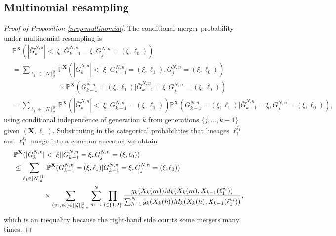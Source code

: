 \documentclass[a4paper,11pt]{article}
\theoremstyle{definition}
\newcommand{\bbP}{\mathbb{P}}
\newcommand{\bfX}{\mathbf{X}}
\begin{document}
\subsection{Multinomial resampling} \label{app:multinomial}

\begin{proof}[Proof of Proposition \ref{prop:multinomial}]

The conditional merger probability under multinomial resampling is
\begin{align*}
&\bbP^{ \bfX }( | \bar{ G }_k^{ N, n } | < | \xi | | \bar{ G }_{ k - 1 }^{ N, n } = \xi, G_j^{ N, n } = ( \xi, \ell_0 ) ) \\
&= \sum_{ \ell_1 \in [ N ]_d^{ | \xi | } } \bbP^{ \bfX }( | \bar{ G }_k^{ N, n } | < | \xi | | G_{ k - 1 }^{ N, n } = ( \xi, \ell_1 ), G_j^{ N, n } = ( \xi, \ell_0 ) ) \\
&\phantom{= \sum_{ \ell_1 \in [ N ]_d^{ | \xi | } } } \times \bbP^{ \bfX }( G_{ k - 1 }^{ N, n } = ( \xi, \ell_1 ) | \bar{ G }_{ k - 1 }^{ N, n } = \xi, G_j^{ N, n } = ( \xi, \ell_0 ) ) \\
&= \sum_{ \ell_1 \in [ N ]_d^{ | \xi | } } \bbP^{ \bfX }( | \bar{ G }_k^{ N, n } | < | \xi | | G_{ k - 1 }^{ N, n } = ( \xi, \ell_1 ) ) \bbP^{ \bfX }( G_{ k - 1 }^{ N, n } = ( \xi, \ell_1 ) | \bar{ G }_{ k - 1 }^{ N, n } = \xi,  G_j^{ N, n } = ( \xi, \ell_0 ) ),
\end{align*}
using conditional independence of generation $k$ from generations $\{ j, \ldots, k - 1 \}$ given $( \bfX, \ell_1 )$.
Substituting in the categorical probabilities that lineages $\ell_1^{ j_1 }$ and $\ell_1^{ j_2 }$ merge into a common ancestor, we obtain
\begin{align}
&\bbP^{ \bfX }( | \bar{ G }_k^{ N, n } | < | \xi | | \bar{ G }_{ k - 1 }^{ N, n } = \xi, G_j^{ N, n } = ( \xi, \ell_0 ) ) \notag\\
&\leq \sum_{ \ell_1 \in [ N ]_d^{ | \xi | } } \bbP^{ \bfX }( G_{ k - 1 }^{ N, n } = ( \xi, \ell_1 ) | \bar{ G }_{ k - 1 }^{ N, n } = \xi, G_j^{ N, n } = ( \xi, \ell_0 ) ) \notag \\
&\phantom{ = \sum_{ \ell_1 \in [ N ]_d^{ | \xi | } } } \times \sum_{ ( v_1, v_2 ) \in [ | \xi | ]_{ d, u }^2 } \sum_{ m = 1 }^N \prod_{ i \in \{ 1, 2 \} } \frac{ g_k( X_k( m ) ) M_k( X_k( m ), X_{ k - 1 }( \ell_1^{ v_i } ) ) }{ \sum_{ h = 1 }^N g_k( X_k( h ) ) M_k( X_k( h ), X_{ k - 1 }( \ell_1^{ v_i } ) ) }, \label{multinomial_ub}
\end{align}
which is an inequality because the right-hand side counts some mergers many times.

\end{proof}
\end{document}
